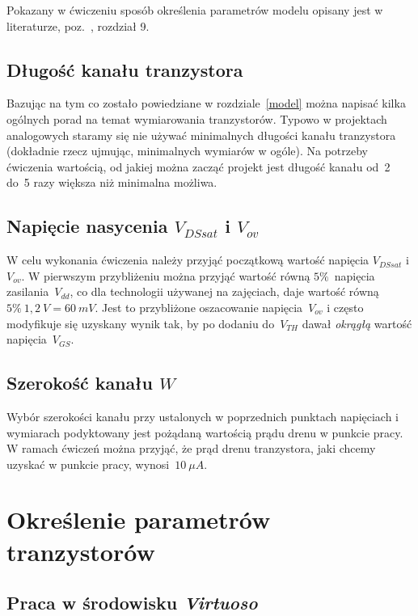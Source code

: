 \documentclass[twoside,pl,final]{labman}
\begin{document}
Pokazany w ćwiczeniu sposób określenia parametrów modelu
opisany jest w literaturze, poz.~\cite{baker:book}, rozdział 9.

\section{Długość kanału tranzystora}
\label{sizing:l}

Bazując na tym co zostało powiedziane w rozdziale~\ref{model} można
napisać kilka ogólnych porad na temat wymiarowania tranzystorów.
Typowo w projektach analogowych staramy się nie używać
minimalnych długości kanału tranzystora
(dokładnie rzecz ujmując, minimalnych wymiarów w ogóle).
Na potrzeby ćwiczenia wartością, od jakiej można zacząć projekt
jest długość kanału od~2 do~5 razy większa niż minimalna możliwa.

\section{Napięcie nasycenia $V_{DSsat}$ i $V_{ov}$}
\label{sizing:vdssat}

W celu wykonania ćwiczenia należy przyjąć początkową
wartość napięcia $V_{DSsat}$ i $V_{ov}$.
W pierwszym przybliżeniu można przyjąć wartość równą
$5\%$~napięcia zasilania~$V_{dd}$,
co dla technologii używanej na zajęciach,
daje wartość równą~$5\% \ 1,2~V = 60~mV$.
Jest to przybliżone oszacowanie napięcia~$V_{ov}$ i często modyfikuje się
uzyskany wynik tak, by po dodaniu do~$V_{TH}$ dawał
\emph{okrągłą} wartość napięcia~$V_{GS}$.

\section{Szerokość kanału $W$}
\label{sizing:w}

Wybór szerokości kanału przy ustalonych w poprzednich punktach napięciach
i wymiarach podyktowany jest pożądaną wartością prądu drenu w punkcie pracy.
W ramach ćwiczeń można przyjąć, że prąd drenu tranzystora,
jaki chcemy uzyskać w punkcie pracy,
wynosi~$10~\mu{}A$.

\chapter{Określenie parametrów tranzystorów}
\label{measure}

\section{Praca w środowisku \emph{Virtuoso}}
\label{measure:virtuoso}
\end{document}
